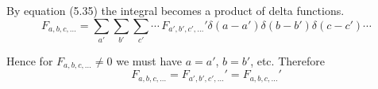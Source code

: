 \documentclass[12pt]{article}
\begin{document}
By equation (5.35) the integral becomes a product of delta functions.
\begin{equation*}
F_{a,b,c,\ldots}
=\sum_{a'}\sum_{b'}\sum_{c'}\cdots\,F_{a',b',c',\ldots}'\delta(a-a')\delta(b-b')\delta(c-c')\cdots
\end{equation*}

Hence for $F_{a,b,c,\ldots}\ne0$ we must have $a=a'$, $b=b'$, etc.
Therefore
\begin{equation*}
F_{a,b,c,\ldots}=F_{a',b',c',\ldots}'=F_{a,b,c,\ldots}'
\end{equation*}
\end{document}
